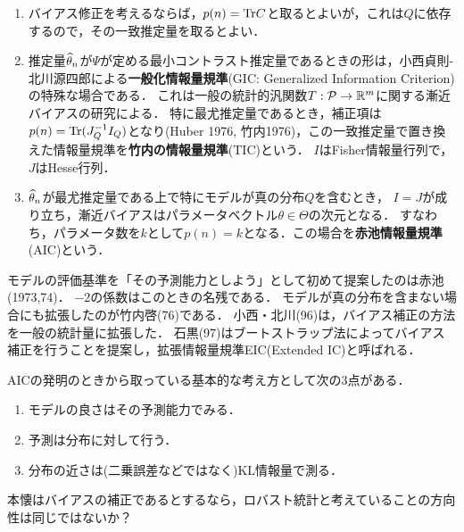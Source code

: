 \documentclass[uplatex,dvipdfmx]{jsreport}
\begin{document}
\begin{example}\mbox{}
    \begin{enumerate}
        \item バイアス修正を考えるならば，$p(n)=\mathrm{Tr} C$と取るとよいが，これは$Q$に依存するので，その一致推定量を取るとよい．
        \item 推定量$\widehat{\theta}_n$が$\Psi$が定める最小コントラスト推定量であるときの形は，小西貞則-北川源四郎による\textbf{一般化情報量規準}(GIC: Generalized Information Criterion)の特殊な場合である．
        これは一般の統計的汎関数$T:\mathcal{P}\to\mathbb{R}^m$に関する漸近バイアスの研究による．
        特に最尤推定量であるとき，補正項は$p(n)=\mathrm{Tr}(J_Q^{-1}I_Q)$となり(Huber 1976, 竹内1976)，この一致推定量で置き換えた情報量規準を\textbf{竹内の情報量規準}(TIC)という．
        $I$はFisher情報量行列で，$J$はHesse行列．
        \item $\widehat{\theta}_n$が最尤推定量である上で特にモデルが真の分布$Q$を含むとき，
        $I=J$が成り立ち，漸近バイアスはパラメータベクトル$\theta\in\Theta$の次元となる．
        すなわち，パラメータ数を$k$として$p(n)=k$となる．この場合を\textbf{赤池情報量規準}(AIC)という．
    \end{enumerate}
\end{example}

\begin{history}
    モデルの評価基準を「その予測能力としよう」として初めて提案したのは赤池(1973,74)．
    $-2$の係数はこのときの名残である．
    モデルが真の分布を含まない場合にも拡張したのが竹内啓(76)である．
    小西・北川(96)は，バイアス補正の方法を一般の統計量に拡張した．
    石黒(97)はブートストラップ法によってバイアス補正を行うことを提案し，拡張情報量規準EIC(Extended IC)と呼ばれる．
\end{history}

\begin{remark}
    AICの発明のときから取っている基本的な考え方として次の3点がある．
    \begin{enumerate}
        \item モデルの良さはその予測能力でみる．
        \item 予測は分布に対して行う．
        \item 分布の近さは(二乗誤差などではなく)KL情報量で測る．
    \end{enumerate}
\end{remark}

\begin{remarks}
    本懐はバイアスの補正であるとするなら，ロバスト統計と考えていることの方向性は同じではないか？
\end{remarks}
\end{document}
